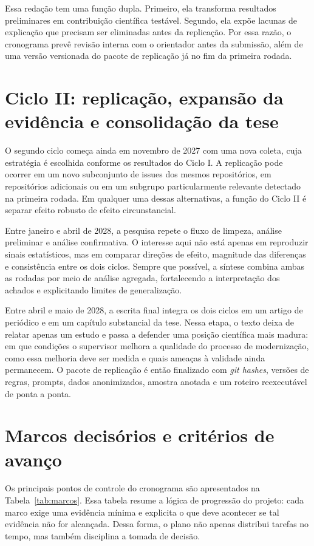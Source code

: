 \documentclass[12pt,a4paper]{article}
\begin{document}
Essa redação tem uma função dupla. Primeiro, ela transforma resultados preliminares em contribuição científica testável. Segundo, ela expõe lacunas de explicação que precisam ser eliminadas antes da replicação. Por essa razão, o cronograma prevê revisão interna com o orientador antes da submissão, além de uma versão versionada do pacote de replicação já no fim da primeira rodada.

\section{Ciclo II: replicação, expansão da evidência e consolidação da tese}

O segundo ciclo começa ainda em novembro de 2027 com uma nova coleta, cuja estratégia é escolhida conforme os resultados do Ciclo I. A replicação pode ocorrer em um novo subconjunto de issues dos mesmos repositórios, em repositórios adicionais ou em um subgrupo particularmente relevante detectado na primeira rodada. Em qualquer uma dessas alternativas, a função do Ciclo II é separar efeito robusto de efeito circunstancial.

Entre janeiro e abril de 2028, a pesquisa repete o fluxo de limpeza, análise preliminar e análise confirmativa. O interesse aqui não está apenas em reproduzir sinais estatísticos, mas em comparar direções de efeito, magnitude das diferenças e consistência entre os dois ciclos. Sempre que possível, a síntese combina ambas as rodadas por meio de análise agregada, fortalecendo a interpretação dos achados e explicitando limites de generalização.

Entre abril e maio de 2028, a escrita final integra os dois ciclos em um artigo de periódico e em um capítulo substancial da tese. Nessa etapa, o texto deixa de relatar apenas um estudo e passa a defender uma posição científica mais madura: em que condições o supervisor melhora a qualidade do processo de modernização, como essa melhoria deve ser medida e quais ameaças à validade ainda permanecem. O pacote de replicação é então finalizado com \textit{git hashes}, versões de regras, prompts, dados anonimizados, amostra anotada e um roteiro reexecutável de ponta a ponta.

\section{Marcos decisórios e critérios de avanço}

Os principais pontos de controle do cronograma são apresentados na Tabela~\ref{tab:marcos}. Essa tabela resume a lógica de progressão do projeto: cada marco exige uma evidência mínima e explicita o que deve acontecer se tal evidência não for alcançada. Dessa forma, o plano não apenas distribui tarefas no tempo, mas também disciplina a tomada de decisão.
\end{document}
